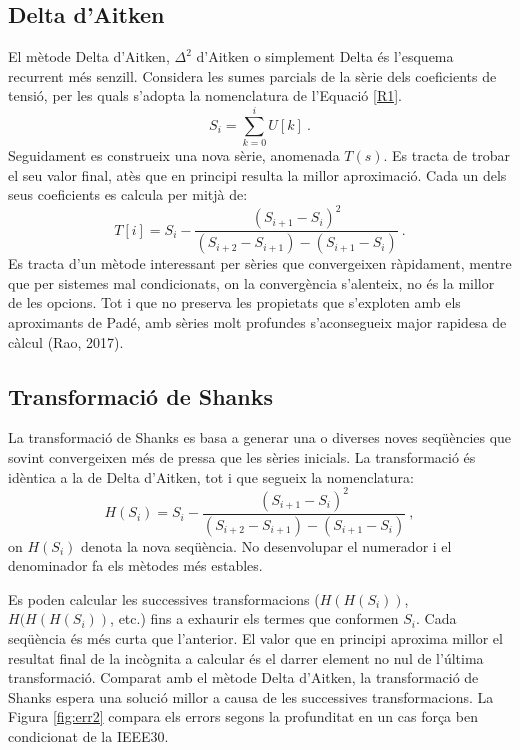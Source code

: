 \subsection{Delta d'Aitken}
El mètode Delta d'Aitken, $\Delta^2$ d'Aitken o simplement Delta és l'esquema recurrent més senzill. Considera les sumes parcials de la sèrie dels coeficients de tensió, per les quals s'adopta la nomenclatura de l'Equació \ref{R1}.
\begin{equation}
S_i = \sum_{k=0}^{i}U[k]\ .
\label{R1}
\end{equation}
Seguidament es construeix una nova sèrie, anomenada $T(s)$. Es tracta de trobar el seu valor final, atès que en principi resulta la millor aproximació. Cada un dels seus coeficients es calcula per mitjà de:
\begin{equation}
T[i]=S_i-\frac{(S_{i+1}-S_i)^2}{(S_{i+2}-S_{i+1})-(S_{i+1}-S_i)}\ .
\label{R2}
\end{equation}
Es tracta d'un mètode interessant per sèries que convergeixen ràpidament, mentre que per sistemes mal condicionats, on la convergència s'alenteix, no és la millor de les opcions. Tot i que no preserva les propietats que s'exploten amb els aproximants de Padé, amb sèries molt profundes s'aconsegueix major rapidesa de càlcul (Rao, 2017). 


\subsection{Transformació de Shanks}
La transformació de Shanks es basa a generar una o diverses noves seqüències que sovint convergeixen més de pressa que les sèries inicials. La transformació és idèntica a la de Delta d'Aitken, tot i que segueix la nomenclatura:
\begin{equation}
    H(S_i) = S_i-\frac{(S_{i+1}-S_i)^2}{(S_{i+2}-S_{i+1})-(S_{i+1}-S_i)}\ ,
    \label{shanks1} 
\end{equation}
on $H(S_i)$ denota la nova seqüència. No desenvolupar el numerador i el denominador fa els mètodes més estables.

Es poden calcular les successives transformacions ($H(H(S_i))$, $H(H(H(S_i))$, etc.) fins a exhaurir els termes que conformen $S_i$. Cada seqüència és més curta que l'anterior. El valor que en principi aproxima millor el resultat final de la incògnita a calcular és el darrer element no nul de l'última transformació. Comparat amb el mètode Delta d'Aitken, la transformació de Shanks espera una solució millor a causa de les successives transformacions. La Figura \ref{fig:err2} compara els errors segons la profunditat en un cas força ben condicionat de la IEEE30. 

